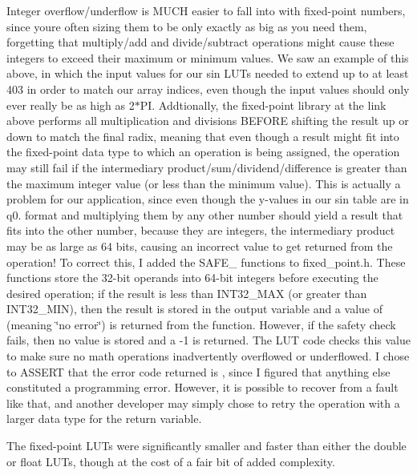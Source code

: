 \begin{DoxyEnumerate}
\item Integer overflow/underflow is M\+U\+CH easier to fall into with fixed-\/point numbers, since you\textquotesingle{}re often sizing them to be only exactly as big as you need them, forgetting that multiply/add and divide/subtract operations might cause these integers to exceed their maximum or minimum values. We saw an example of this above, in which the input values for our sin L\+U\+Ts needed to extend up to at least 403 in order to match our array indices, even though the input values should only ever really be as high as 2$\ast$\+PI. Addtionally, the fixed-\/point library at the link above performs all multiplication and divisions B\+E\+F\+O\+RE shifting the result up or down to match the final radix, meaning that even though a result might fit into the fixed-\/point data type to which an operation is being assigned, the operation may still fail if the intermediary product/sum/dividend/difference is greater than the maximum integer value (or less than the minimum value). This is actually a problem for our application, since even though the y-\/values in our sin table are in q0. format and multiplying them by any other number should yield a result that fits into the other number, because they are integers, the intermediary product may be as large as 64 bits, causing an incorrect value to get returned from the operation! To correct this, I added the {\ttfamily S\+A\+F\+E\+\_\+} functions to {\ttfamily fixed\+\_\+point.\+h}. These functions store the 32-\/bit operands into 64-\/bit integers before executing the desired operation; if the result is less than I\+N\+T32\+\_\+\+M\+AX (or greater than I\+N\+T32\+\_\+\+M\+IN), then the result is stored in the output variable and a value of {} (meaning \char`\"{}no error\char`\"{}) is returned from the function. However, if the safety check fails, then no value is stored and a {\ttfamily -\/1} is returned. The L\+UT code checks this value to make sure no math operations inadvertently overflowed or underflowed. I chose to {\ttfamily A\+S\+S\+E\+RT} that the error code returned is {}, since I figured that anything else constituted a programming error. However, it is possible to recover from a fault like that, and another developer may simply chose to retry the operation with a larger data type for the return variable.
\end{DoxyEnumerate}

The fixed-\/point L\+U\+Ts were significantly smaller and faster than either the double or float L\+U\+Ts, though at the cost of a fair bit of added complexity.

